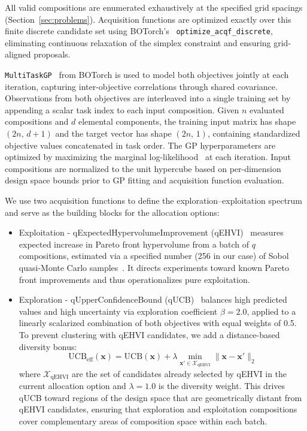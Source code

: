 All valid compositions are enumerated exhaustively at the specified grid spacings (Section~\ref{sec:problems}). Acquisition functions are optimized exactly over this finite discrete candidate set using BOTorch's~\cite{Balandat2020} \texttt{optimize\_acqf\_discrete}, eliminating continuous relaxation of the simplex constraint and ensuring grid-aligned proposals.

\label{sec:gp}
\texttt{MultiTaskGP}~\cite{Balandat2020,Bonilla2008,Swersky2013} from BOTorch is used to model both objectives jointly at each iteration, capturing inter-objective correlations through shared covariance. Observations from both objectives are interleaved into a single training set by appending a scalar task index to each input composition. Given $n$ evaluated compositions and $d$ elemental components, the training input matrix has shape $(2n,\, d+1)$ and the target vector has shape $(2n,\, 1)$, containing standardized objective values concatenated in task order. The GP hyperparameters are optimized by maximizing the marginal log-likelihood~\cite{Rasmussen2006} at each iteration. Input compositions are normalized to the unit hypercube based on per-dimension design space bounds prior to GP fitting and acquisition function evaluation.

\label{sec:acqf}
We use two acquisition functions to define the exploration–exploitation spectrum and serve as the building blocks for the allocation options:
\begin{itemize}

    \item Exploitation - qExpectedHypervolumeImprovement (qEHVI)~\cite{Daulton2020} measures expected increase in Pareto front hypervolume from a batch of $q$ compositions, estimated via a specified number (256 in our case) of Sobol quasi-Monte Carlo samples~\cite{Joe2008,Balandat2020}. It directs experiments toward known Pareto front improvements and thus operationalizes pure exploitation.

    \item Exploration - qUpperConfidenceBound (qUCB)~\cite{Wilson2017} balances high predicted values and high uncertainty via exploration coefficient $\beta=2.0$, applied to a linearly scalarized combination of both objectives with equal weights of 0.5. To prevent clustering with qEHVI candidates, we add a distance-based diversity bonus:
    \begin{equation}
    \label{eq:ucb-diversity}
    \text{UCB}_{\text{eff}}(\mathbf{x}) = \text{UCB}(\mathbf{x}) + \lambda \min_{\mathbf{x}' \in \mathcal{X}_{\text{qEHVI}}} \|\mathbf{x} - \mathbf{x}'\|_2
    \end{equation}
    where $\mathcal{X}_{\text{qEHVI}}$ are the set of candidates already selected by qEHVI in the current allocation option and $\lambda=1.0$ is the diversity weight. This drives qUCB toward regions of the design space that are geometrically distant from qEHVI candidates, ensuring that exploration and exploitation compositions cover complementary areas of composition space within each batch.

\end{itemize}


